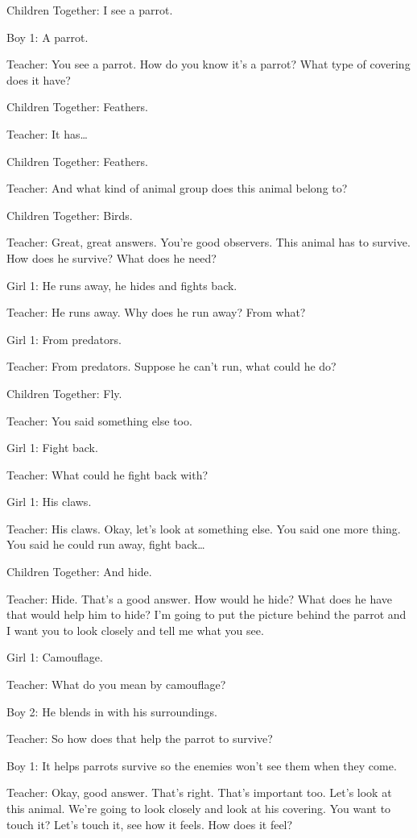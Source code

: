 Children Together: I see a parrot.

Boy 1: A parrot.

Teacher: You see a parrot. How do you know it's a parrot? What type of covering does it have?

Children Together: Feathers.

Teacher: It has\dots

Children Together: Feathers.

Teacher: And what kind of animal group does this animal belong to?

Children Together: Birds.

Teacher: Great, great answers. You're good observers. This animal has to survive. How does he survive? What does he need?

Girl 1: He runs away, he hides and fights back.

Teacher: He runs away. Why does he run away? From what?

Girl 1: From predators.

Teacher: From predators. Suppose he can't run, what could he do?

Children Together: Fly.

Teacher: You said something else too.

Girl 1: Fight back.

Teacher: What could he fight back with?

Girl 1: His claws.

Teacher: His claws. Okay, let's look at something else. You said one more thing. You said he could run away, fight back\dots

Children Together: And hide.

Teacher: Hide. That's a good answer. How would he hide? What does he have that would help him to hide? I'm going to put the picture behind the parrot and I want you to look closely and tell me what you see.

Girl 1: Camouflage.

Teacher: What do you mean by camouflage?

Boy 2: He blends in with his surroundings.

Teacher: So how does that help the parrot to survive?

Boy 1: It helps parrots survive so the enemies won't see them when they come.

Teacher: Okay, good answer. That's right. That's important too. Let's look at this animal. We're going to look closely and look at his covering. You want to touch it? Let's touch it, see how it feels. How does it feel?

